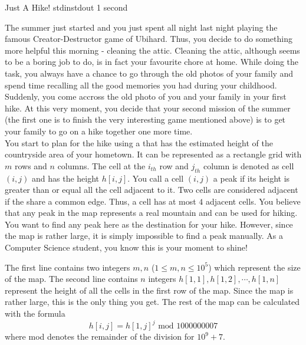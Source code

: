 
\begin{problem}{Just A Hike!}
{stdin}{stdout}
{1 second}{}{}

The summer just started and you just spent all night last night playing the famous Creator-Destructor game of Ubihard. 
Thus, you decide to do something more helpful this morning - cleaning the attic. Cleaning the attic, although seems to be
a boring job to do, is in fact your favourite chore at home. While doing the task, you always have a chance to go through 
the old photos of your family and spend time recalling all the good memories you had during your childhood. Suddenly, you 
come accross the old photo of you and your family in your first hike. At this very moment, you decide that your second
mission of the summer (the first one is to finish the very interesting game mentioned above) is to get your family to go
on a hike together one more time.\\

You start to plan for the hike using a that has the estimated height of the countryside area of your hometown. It can be 
represented as a rectangle grid with $m$ rows and $n$ columns. The cell at the $i_{th}$ row and $j_{th}$ column is denoted 
as cell $(i, j)$ and has the height $h[i, j]$. You call a cell $(i, j)$ a peak if its height is greater than or equal all 
the cell adjacent to it. Two cells are considered adjacent if the share a common edge. Thus, a cell has at most $4$ adjacent 
cells. You believe that any peak in the map represents a real mountain and can be used for hiking. You want to find any peak 
here as the destination for your hike. However, since the map is rather large, it is simply impossible to find a peak manually.
As a Computer Science student, you know this is your moment to shine!

\InputFile

The first line contains two integers $m, n$ ($1 \leq m, n \leq 10^5$) which represent the size of the map. The second line
contains $n$ integers $h[1, 1], h[1, 2], \cdots, h[1, n]$ represent the height of all the cells in the first row of the
map. Since the map is rather large, this is the only thing you get. The rest of the map can be calculated with the formula
    \begin{equation}
       h[i, j] = h[1, j]^j \text{ mod } 1000000007
    \end{equation}
where mod denotes the remainder of the division for $10^9 + 7$.


\end{problem}

